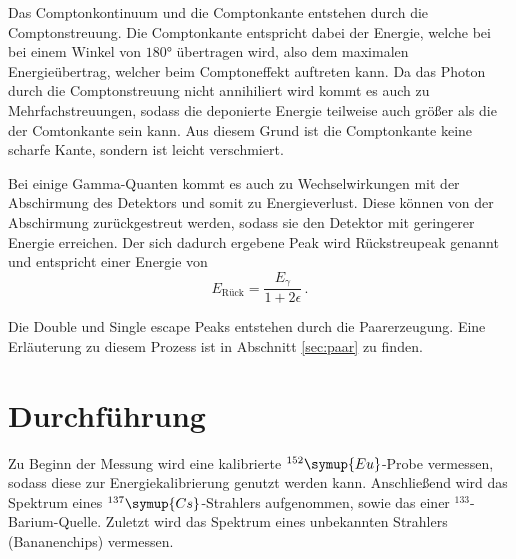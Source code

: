 Das Comptonkontinuum und die Comptonkante entstehen durch die Comptonstreuung.
Die Comptonkante entspricht dabei der Energie, welche bei bei einem Winkel von $180°$ übertragen wird, also dem maximalen Energieübertrag, welcher beim Comptoneffekt auftreten kann.
Da das Photon durch die Comptonstreuung nicht annihiliert wird kommt es auch zu Mehrfachstreuungen, sodass die deponierte Energie teilweise auch größer als die der Comtonkante sein kann.
Aus diesem Grund ist die Comptonkante keine scharfe Kante, sondern ist leicht verschmiert.

Bei einige Gamma-Quanten kommt es auch zu Wechselwirkungen mit der Abschirmung des Detektors und somit zu Energieverlust.
Diese können von der Abschirmung zurückgestreut werden, sodass sie den Detektor mit geringerer Energie erreichen.
Der sich dadurch ergebene Peak wird Rückstreupeak genannt und entspricht einer Energie von
\begin{equation}
E_\text{Rück}= \frac{E_{\gamma}}{1+2\epsilon}\, .
\end{equation}

Die Double und Single escape Peaks entstehen durch die Paarerzeugung.
Eine Erläuterung zu diesem Prozess ist in Abschnitt \ref{sec:paar} zu finden. 

\section{Durchführung}
Zu Beginn der Messung wird eine kalibrierte $^{152}\symup{Eu}$-Probe vermessen, sodass diese zur Energiekalibrierung genutzt werden kann.
Anschließend wird das Spektrum eines $^{137}\symup{Cs}$-Strahlers aufgenommen, sowie das einer $^{133}$-Barium-Quelle.
Zuletzt wird das Spektrum eines unbekannten Strahlers (Bananenchips) vermessen.

\nocite{wingate}
\nocite{*}
\printbibliography

